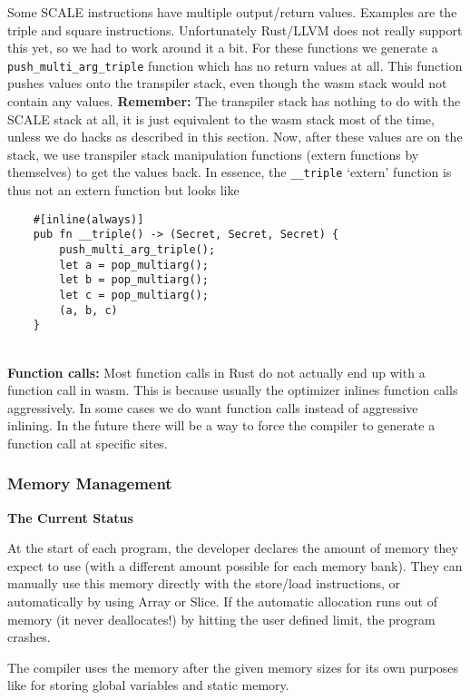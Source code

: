 Some SCALE instructions have multiple output/return values. Examples are the triple and square instructions.
Unfortunately Rust/LLVM does not really support this yet, so we had to work around it a bit.
For these functions we generate a \verb|push_multi_arg_triple| function which has no return values at all.
This function pushes values onto the transpiler stack, even though the wasm stack would not contain any values.
     {\bf Remember:} The transpiler stack has nothing to do with the SCALE stack at all,
it is just equivalent to the wasm stack most of the time, unless we do hacks as described in this section.
Now, after these values are on the stack, we use transpiler stack manipulation functions (extern functions by themselves)
to get the values back. In essence, the \verb|__triple| `extern' function is thus not an extern function but looks like
\begin{lstlisting}
    #[inline(always)]
    pub fn __triple() -> (Secret, Secret, Secret) {
        push_multi_arg_triple();
        let a = pop_multiarg();
        let b = pop_multiarg();
        let c = pop_multiarg();
        (a, b, c)
    }
\end{lstlisting}

~\\

\noindent
{\bf Function calls:}
Most function calls in Rust do not actually end up with a function call in
wasm. This is because usually the optimizer inlines function calls aggressively.
In some cases we do want function calls instead of aggressive inlining.
In the future there will be a way to force the compiler to generate a function call at
specific sites.

\subsubsection{Memory Management}
{\bf The Current Status}

At the start of each program, the developer declares the amount of memory they expect to use (with a different amount possible for each memory bank). They can manually use this memory directly with the store/load instructions, or automatically by using Array or Slice. If the automatic allocation runs out of memory (it never deallocates!) by hitting the user defined limit, the program crashes.

The compiler uses the memory after the given memory sizes for its own purposes like for storing global variables and static memory.

